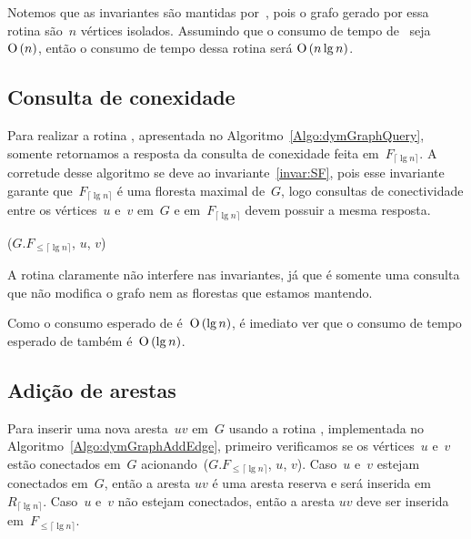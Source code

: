 Notemos que as invariantes são mantidas por~\dymGraphCreate{}, pois o grafo gerado por essa rotina são~$n$ vértices isolados. Assumindo que o consumo de tempo de~\graphCreate{} seja~$\text{O}\left(n\right)$, então o consumo de tempo dessa rotina será $\text{O}\left(n\lg n\right)$.

\subsection{Consulta de conexidade}

Para realizar a rotina \dymGraphQuery{}, apresentada no Algoritmo~\ref{Algo:dymGraphQuery}, somente retornamos a resposta da consulta de conexidade feita em~$F_{\lceil \lg n \rceil}$. A corretude desse algoritmo se deve ao invariante~\ref{invar:SF}, pois esse invariante garante que~$F_{\lceil \lg n \rceil}$ é uma floresta maximal de~$G$, logo consultas de conectividade entre os vértices~$u$ e~$v$ em~$G$ e em~$F_{\lceil \lg n \rceil}$ devem possuir a mesma resposta.

\begin{algorithm}
\caption{\dymGraphQuery($G$, $u$, $v$)}
\label{Algo:dymGraphQuery}
\begin{algorithmic}[1]
\State \Return \dymForestQuery($G$.$F_{\leqslant\lceil \lg n \rceil}$, $u$, $v$)
\end{algorithmic}
\end{algorithm}

A rotina \dymGraphQuery{} claramente não interfere nas invariantes, já que  é somente uma consulta que não modifica o grafo nem as florestas que estamos mantendo.

Como o consumo esperado de \dymForestQuery{} é~$\text{O}\left(\lg n\right)$, é imediato ver que o consumo de tempo esperado de \dymGraphQuery{} também é~$\text{O}\left(\lg n\right)$.

\subsection{Adição de arestas}

Para inserir uma nova aresta~$uv$ em~$G$ usando a rotina \dymGraphAddEdge{}, implementada no Algoritmo~\ref{Algo:dymGraphAddEdge}, primeiro verificamos se os vértices~$u$ e~$v$ estão conectados em~$G$ acionando~\dymForestQuery($G.F_{\leqslant \lceil \lg n \rceil}$, $u$, $v$). Caso~$u$ e~$v$ estejam conectados em~$G$, então a aresta $uv$ é uma aresta reserva e será inserida em $R_{\lceil \lg n \rceil}$. Caso~$u$ e~$v$ não estejam conectados, então a aresta $uv$ deve ser inserida em~$F_{\leqslant \lceil \lg n \rceil}$.

